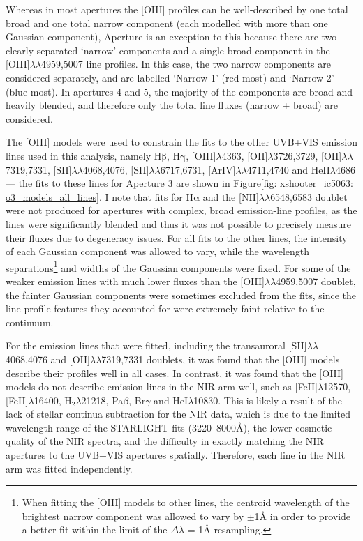 Whereas in most apertures the [OIII] profiles can be well-described by one total broad and one total narrow component (each modelled with more than one Gaussian component), Aperture is an exception to this because there are two clearly separated `narrow' components and a single broad component in the [OIII]$\lambda\lambda$4959,5007 line profiles. In this case, the two narrow components are considered separately, and are labelled `Narrow 1' (red-most) and `Narrow 2' (blue-most). In apertures 4 and 5, the majority of the components are broad and heavily blended, and therefore only the total line fluxes (narrow + broad) are considered.

\vfill
\newpage

The [OIII] models were used to constrain the fits to the other UVB+VIS emission lines used in this analysis, namely H$\mathrm{\beta}$, H$\mathrm{\gamma}$, [OIII]$\lambda$4363, [OII]$\lambda$3726,3729, [OII]$\lambda\lambda$7319,7331, [SII]$\lambda\lambda$4068,4076, [SII]$\lambda\lambda$6717,6731, [ArIV]$\lambda\lambda$4711,4740 and HeII$\lambda$4686 --- the fits to these lines for Aperture 3 are shown in Figure\;\ref{fig: xshooter_ic5063: o3_models_all_lines}. I note that fits for H$\mathrm{\alpha}$ and the [NII]$\lambda\lambda$6548,6583 doublet were not produced for apertures with complex, broad emission-line profiles, as the lines were significantly blended and thus it was not possible to precisely measure their fluxes due to degeneracy issues. For all fits to the other lines, the intensity of each Gaussian component was allowed to vary, while the wavelength separations\footnote{When fitting the [OIII] models to other lines, the centroid wavelength of the brightest narrow component was allowed to vary by $\pm$1{\;\AA} in order to provide a better fit within the limit of the $\Delta\lambda$ = 1{\;\AA} resampling.} and widths of the Gaussian components were fixed. For some of the weaker emission lines with much lower fluxes than the [OIII]$\lambda\lambda$4959,5007 doublet, the fainter Gaussian components were sometimes excluded from the fits, since the line-profile features they accounted for were extremely faint relative to the continuum.

For the emission lines that were fitted, including the transauroral [SII]$\lambda\lambda$4068,4076 and [OII]$\lambda\lambda$7319,7331 doublets, it was found that the [OIII] models describe their profiles well in all cases. In contrast, it was found that the [OIII] models do not describe emission lines in the NIR arm well, such as [FeII]$\lambda$12570, [FeII]$\lambda$16400, H$_2 \lambda$21218, Pa$\beta$, Br$\gamma$ and HeI$\lambda$10830. This is likely a result of the lack of stellar continua subtraction for the NIR data, which is due to the limited wavelength range of the \textsc{STARLIGHT} fits (3220--8000\;\AA), the lower cosmetic quality of the NIR spectra, and the difficulty in exactly matching the NIR apertures to the UVB+VIS apertures spatially. Therefore, each line in the NIR arm was fitted independently. \\

